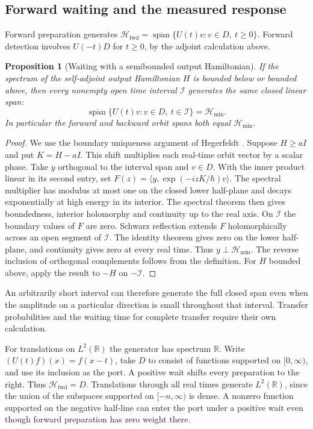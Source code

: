 \documentclass[11pt]{article}
\newtheorem{proposition}{Proposition}[section]
\theoremstyle{definition}
\DeclareMathOperator{\Span}{span}
\newcommand{\R}{\mathbb R}
\newcommand{\Hmin}{\mathcal H_{\min}}
\begin{document}
\subsection{Forward waiting and the measured response}

Forward preparation generates $\mathcal H_{\mathrm{fwd}}=\overline{\Span}\{U(t)v:v\in D,\ t\geq0\}$. Forward detection involves $U(-t)D$ for $t\geq0$, by the adjoint calculation above.

\begin{proposition}[Waiting with a semibounded output Hamiltonian]\label{prop:semibounded-waiting}
If the spectrum of the self-adjoint output Hamiltonian $H$ is bounded below or bounded above, then every nonempty open time interval $\mathcal I$ generates the same closed linear span:
\[
 \overline{\Span}\{U(t)v:v\in D,\ t\in\mathcal I\}=\Hmin .
\]
In particular the forward and backward orbit spans both equal $\Hmin$.
\end{proposition}
\begin{proof}
We use the boundary uniqueness argument of Hegerfeldt \cite[Sec.~2]{Hegerfeldt1998}. Suppose $H\geq aI$ and put $K=H-aI$. This shift multiplies each real-time orbit vector by a scalar phase. Take $y$ orthogonal to the interval span and $v\in D$. With the inner product linear in its second entry, set $F(z)=\langle y,\exp(-izK/\hbar)v\rangle$. The spectral multiplier has modulus at most one on the closed lower half-plane and decays exponentially at high energy in its interior. The spectral theorem then gives boundedness, interior holomorphy and continuity up to the real axis. On $\mathcal I$ the boundary values of $F$ are zero. Schwarz reflection extends $F$ holomorphically across an open segment of $\mathcal I$. The identity theorem gives zero on the lower half-plane, and continuity gives zero at every real time. Thus $y\perp\Hmin$. The reverse inclusion of orthogonal complements follows from the definition. For $H$ bounded above, apply the result to $-H$ on $-\mathcal I$.
\end{proof}
An arbitrarily short interval can therefore generate the full closed span even when the amplitude on a particular direction is small throughout that interval. Transfer probabilities and the waiting time for complete transfer require their own calculation.

For translations on $L^2(\R)$ the generator has spectrum $\R$. Write $(U(t)f)(x)=f(x-t)$, take $D$ to consist of functions supported on $[0,\infty)$, and use its inclusion as the port. A positive wait shifts every preparation to the right. Thus $\mathcal H_{\mathrm{fwd}}=D$. Translations through all real times generate $L^2(\R)$, since the union of the subspaces supported on $[-n,\infty)$ is dense. A nonzero function supported on the negative half-line can enter the port under a positive wait even though forward preparation has zero weight there.
\end{document}
